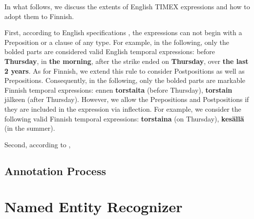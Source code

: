 \documentclass[11pt]{article}
\begin{document}

In what follows, we discuss the extents of English TIMEX expressions and how to adopt them to Finnish.

First, according to English specifications \citep{verhagen2010}, the expressions can not begin with a Preposition or a clause of any type. For example, in the following, only the bolded parts are considered valid English temporal expressions: before \textbf{Thursday}, in \textbf{the morning}, after the strike ended on \textbf{Thursday}, over \textbf{the last 2 years}. As for Finnish, we extend this rule to consider Postpositions as well as Prepositions. Consequently, in the following, only the bolded parts are markable Finnish temporal expressions: ennen \textbf{torstaita} (before Thursday), \textbf{torstain} j\"alkeen (after Thursday). However, we allow the Prepositions and Postpositions if they are included in the expression via inflection. For example, we consider the following valid Finnish temporal expressions: \textbf{torstaina} (on Thursday), \textbf{kes\"all\"a} (in the summer).

Second, according to \citep{verhagen2010}, 



\subsection{Annotation Process}





\section{Named Entity Recognizer}
\label{sec: named entity recognizer}
\end{document}
